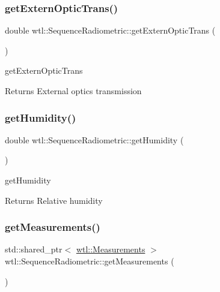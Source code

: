 \subsubsection{\texorpdfstring{get\+Extern\+Optic\+Trans()}{getExternOpticTrans()}}
{\footnotesize\ttfamily double wtl\+::\+Sequence\+Radiometric\+::get\+Extern\+Optic\+Trans (\begin{DoxyParamCaption}{ }\end{DoxyParamCaption})}



get\+Extern\+Optic\+Trans 

\begin{DoxyReturn}{Returns}
External optics transmission 
\end{DoxyReturn}
\mbox{\label{classwtl_1_1_sequence_radiometric_a5c45c9e5200e04e67fa65cb56f1f17dc}} 
\subsubsection{\texorpdfstring{get\+Humidity()}{getHumidity()}}
{\footnotesize\ttfamily double wtl\+::\+Sequence\+Radiometric\+::get\+Humidity (\begin{DoxyParamCaption}{ }\end{DoxyParamCaption})}



get\+Humidity 

\begin{DoxyReturn}{Returns}
Relative humidity 
\end{DoxyReturn}
\mbox{\label{classwtl_1_1_sequence_radiometric_a4084caa5e30330375300173b4b0582d0}} 
\subsubsection{\texorpdfstring{get\+Measurements()}{getMeasurements()}}
{\footnotesize\ttfamily std\+::shared\+\_\+ptr$<$ \hyperlink{classwtl_1_1_measurements}{wtl\+::\+Measurements} $>$ wtl\+::\+Sequence\+Radiometric\+::get\+Measurements (\begin{DoxyParamCaption}{ }\end{DoxyParamCaption})}



